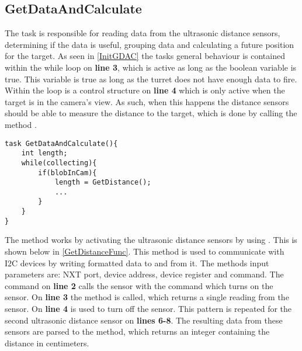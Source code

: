 \subsection{GetDataAndCalculate}\label{GetDataAndCalc}
The task  is responsible for reading data
from the ultrasonic distance sensors, determining if the data is useful,
grouping data and calculating a future position for the target. As seen in
\autoref{InitGDAC} the tasks general behaviour is contained within the while
loop on \textbf{line 3}, which is active as long as the boolean variable
 is true. This variable is true as long as the
turret does not have enough data to fire. Within the loop is a control structure
on \textbf{line 4} which is only active when the target is in the
camera's view. As such, when this happens the distance sensors should be able
to measure the distance to the target, which is done by calling the method
.\nl

\begin{minipage}[H]{\linewidth}
\begin{lstlisting}[caption = General behaviour for \texttt{GetDataAndCalculate},
label = InitGDAC] 
task GetDataAndCalculate(){
    int length;
    while(collecting){
        if(blobInCam){
            length = GetDistance();
            ...
        }
    }
}
\end{lstlisting}
\end{minipage}

The  method works by activating the ultrasonic distance
sensors by using . This is shown below in
\autoref{GetDistanceFunc}. This method is used to communicate with I2C devices
by writing formatted data to and from it. The methods input parameters are: NXT
port, device address, device register and command. The command on \textbf{line
2} calls the sensor with the command  which turns on
the sensor. On \textbf{line 3} the  method is called, which
returns a single reading from the sensor. On \textbf{line 4}
 is used to turn off the sensor. This pattern is repeated
for the second ultrasonic distance sensor on \textbf{lines 6-8}. The resulting
data from these sensors are parsed to the  method, which
returns an integer containing the distance in centimeters.\nl

